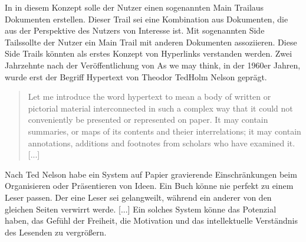 In in diesem Konzept solle der Nutzer einen sogenannten \glqq Main Trail\grqq{ }aus Dokumenten erstellen. Dieser Trail sei eine Kombination aus Dokumenten, die aus der Perspektive des Nutzers von Interesse ist. Mit sogenannten \glqq Side Tails\grqq{ }sollte der Nutzer ein Main Trail mit anderen Dokumenten \glqq assoziieren\grqq{ }\cite[Section 7]{Bush1945}. Diese Side Trails könnten als erstes Konzept von Hyperlinks verstanden werden. Zwei Jahrzehnte nach der Veröffentlichung von \glqq As we may think\grqq{ }, in der 1960er Jahren, wurde erst der Begriff Hypertext von Theodor \glqq Ted\grqq{ }Holm Nelson geprägt. 

\begin{quote}
	\glqq Let me introduce the word hypertext to mean a body of written or pictorial material interconnected in such a complex way that it could not conveniently be presented or represented on paper. It may contain summaries, or maps of its contents and theier interrelations; it may contain annotations, additions and footnotes from scholars who have examined it. [...]\grqq{ }\cite{Nelson1965}
\end{quote}

Nach Ted Nelson \glqq habe ein System auf Papier gravierende Einschränkungen beim Organisieren oder Präsentieren von Ideen. Ein Buch könne nie perfekt zu einem Leser passen. Der eine Leser sei gelangweilt, während ein anderer von den gleichen Seiten verwirrt werde. [...] Ein solches System könne das Potenzial haben, das Gefühl der Freiheit, die Motivation und das intellektuelle Verständnis des Lesenden zu vergrößern\grqq{ }\cite{Nelson1965}. 

